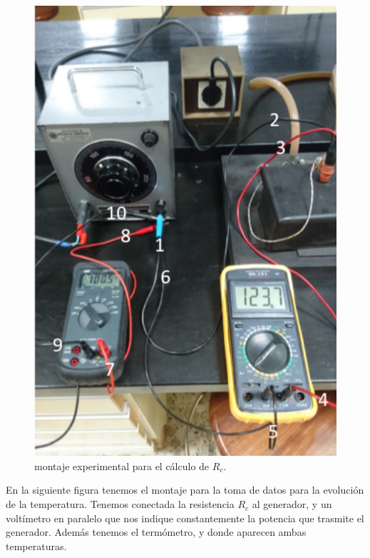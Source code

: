 \documentclass[12pt,a4paper]{article}
\begin{document}
\begin{figure}[h!] \centering
\includegraphics[scale=1.0]{foto3.png}
\caption{montaje experimental para el cálculo de $R_c$.}
\label{Fig:foto3}
\end{figure}

\newpage

En la siguiente figura tenemos el montaje para la toma de datos para la evolución de la temperatura. Tenemos conectada la resistencia $R_c$ al generador, y un voltímetro en paralelo que nos indique constantemente la potencia que trasmite el generador. Además tenemos el termómetro, y donde aparecen ambas temperaturas.
\end{document}
